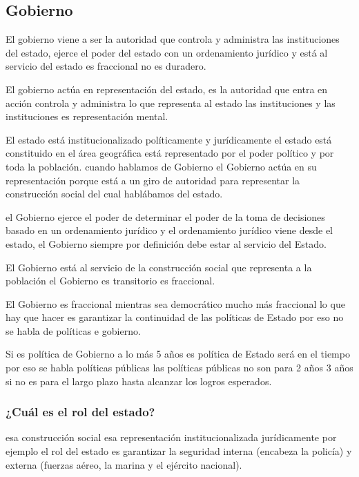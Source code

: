\documentclass[
  a4paper,
]{article}
\begin{document}
\subsection{Gobierno}\label{gobierno}

El gobierno viene a ser la autoridad que controla y administra las
instituciones del estado, ejerce el poder del estado con un ordenamiento
jurídico y está al servicio del estado es fraccional no es duradero.

El gobierno actúa en representación del estado, es la autoridad que
entra en acción controla y administra lo que representa al estado las
instituciones y las instituciones es representación mental.

El estado está institucionalizado políticamente y jurídicamente el
estado está constituido en el área geográfica está representado por el
poder político y por toda la población. cuando hablamos de Gobierno el
Gobierno actúa en su representación porque está a un giro de autoridad
para representar la construcción social del cual hablábamos del estado.

el Gobierno ejerce el poder de determinar el poder de la toma de
decisiones basado en un ordenamiento jurídico y el ordenamiento jurídico
viene desde el estado, el Gobierno siempre por definición debe estar al
servicio del Estado.

El Gobierno está al servicio de la construcción social que representa a
la población el Gobierno es transitorio es fraccional.

El Gobierno es fraccional mientras sea democrático mucho más fraccional
lo que hay que hacer es garantizar la continuidad de las políticas de
Estado por eso no se habla de políticas e gobierno.

Si es política de Gobierno a lo más 5 años es política de Estado será en
el tiempo por eso se habla políticas públicas las políticas públicas no
son para 2 años 3 años si no es para el largo plazo hasta alcanzar los
logros esperados.

\subsubsection{¿Cuál es el rol del
estado?}\label{cuuxe1l-es-el-rol-del-estado}

esa construcción social esa representación institucionalizada
jurídicamente por ejemplo el rol del estado es garantizar la seguridad
interna (encabeza la policía) y externa (fuerzas aéreo, la marina y el
ejército nacional).
\end{document}
